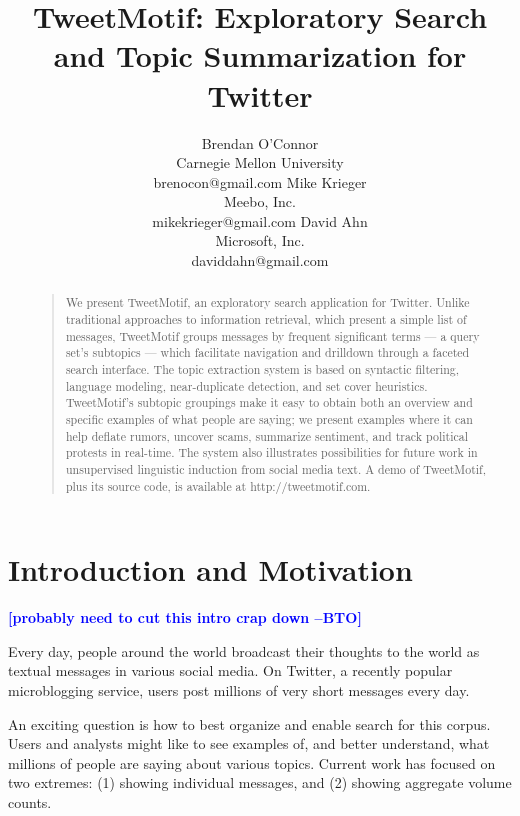 \documentclass[letterpaper]{article}
\newcommand{\bto}[1]{\textcolor{blue}{\textbf{[#1 --BTO]}}}
\begin{document}
%
\title{TweetMotif: Exploratory Search and Topic Summarization for Twitter}
\author{Brendan O'Connor \\ 
Carnegie Mellon University \\ brenocon@gmail.com
\And
Mike Krieger \\ Meebo, Inc. \\ mikekrieger@gmail.com
\And
David Ahn \\ Microsoft, Inc. \\ daviddahn@gmail.com
}
\maketitle
\begin{abstract}
\begin{quote}
We present TweetMotif, an exploratory search application for Twitter.  Unlike traditional approaches to information retrieval, which present a simple list of messages, TweetMotif groups messages by frequent significant terms --- a query set's subtopics --- which facilitate navigation and drilldown through a faceted search interface.  The topic extraction system is based on syntactic filtering, language modeling, near-duplicate detection, and set cover heuristics.  TweetMotif's subtopic groupings make it easy to obtain both an overview and specific examples of what people are saying; we present examples where it can help deflate rumors, uncover scams, summarize sentiment, and track political protests in real-time.  The system also illustrates possibilities for future work in unsupervised linguistic induction from social media text.  A demo of TweetMotif, plus its source code, is available at http://tweetmotif.com.
\end{quote}
\end{abstract}

\section{Introduction and Motivation}

\bto{probably need to cut this intro crap down}

Every day, people around the world broadcast their thoughts to the world as textual messages in various social media.  On Twitter, a recently popular microblogging service, users post millions of very short messages every day.

An exciting question is how to best organize and enable search for this corpus.  Users and analysts might like to see examples of, and better understand, what millions of people are saying about various topics.  Current work has focused on two extremes: (1) showing individual messages, and (2) showing aggregate volume counts.
\end{document}
